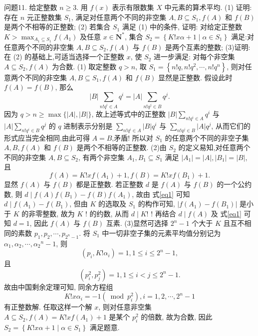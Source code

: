 问题11. 给定整数 $n \geqslant 3$. 用 $f(x)$ 表示有限数集 $X$ 中元素的算术平均.
(1) 证明: 存在 $n$ 元正整数集 $S_1$, 满足对任意两个不同的非空集 $A, B \subseteq S_1, f(A)$ 和 $f(B)$ 是两个不相等的正整数;
(2) 若集合 $S_1$ 满足 (1) 中的条件, 证明: 对给定正整数 $K>\max _{A_1 \subseteq S_1} f\left(A_1\right)$ 及任意 $x \in \mathbf{N}^*$, 集合 $S_2=\left\{K ! x \alpha+1 \mid \alpha \in S_1\right\}$ 满足:对任意两个不同的非空集 $A, B \subseteq S_2, f(A)$ 与 $f(B)$ 是两个互素的整数;
(3)证明: 在 (2) 的基础上,可适当选择一个正整数 $x$, 使 $S_2$ 进一步满足: 对每个非空集 $A \subseteq S_2, f(A)$ 为合数.
(1) 取定整数 $q>n$, 取 $S_1=\left\{n ! q, n ! q^2, \cdots, n ! q^n\right\}$, 则对任意两个不同的非空集 $A, B \subseteq S_1, f(A)$ 和 $f(B)$ 显然是正整数.
假设此时 $f(A)= f(B)$, 那么
$$
|B| \sum_{n ! q^i \in A} q^i=|A| \sum_{n ! q^j \in B} q^j .
$$
因为 $q>n \geqslant \max \{|A|,|B|\}$, 故上述等式中的正整数 $|B| \sum_{n ! q^i \in A} q^i$ 与 $|A| \sum_{n ! q^i \in B} q^j$ 的 $q$ 进制表示分别是 $\sum_{n ! q^i \in A}|B| q^i$ 与 $\sum_{n ! q^j \in B}|A| q^j$, 从而它们的形式应当完全相同,由此可得 $A=B$,矛盾!
所以对 $S_1$ 的任意两个不同的非空子集 $A, B, f(A)$ 和 $f(B)$ 是两个不相等的正整数.
(2)由 $S_2$ 的定义易知,对任意两个不同的非空集 $A, B \subseteq S_2$, 有两个非空集 $A_1, B_1 \subseteq S_1$ 满足 $\left|A_1\right|=|A|,\left|B_1\right|=|B|$, 且
$$
f(A)=K ! x f\left(A_1\right)+1, f(B)=K ! x f\left(B_1\right)+1 . \label{eq1}
$$
显然 $f(A)$ 与 $f(B)$ 都是正整数.
若正整数 $d$ 是 $f(A)$ 与 $f(B)$ 的一个公约数, 则 $d \mid f(A) f\left(B_1\right)- f(B) f\left(A_1\right)$, 故由 式\ref{eq1} 可知 $d \mid f\left(A_1\right)-f\left(B_1\right)$, 但由 $K$ 的选取及 $S_1$ 的构作可知, $\left|f\left(A_1\right)-f\left(B_1\right)\right|$ 是小于 $K$ 的非零整数, 故为 $K$ ! 的约数, 从而 $d \mid K !$ ! 再结合 $d \mid f(A)$ 及 式\ref{eq1} 可知 $d=1$, 因此 $f(A)$ 与 $f(B)$ 互素.
(3)显然可选择 $2^n-1$ 个大于 $K$ 且互不相同的素数 $p_1, p_2, \cdots, p_{2^n-1}$. 将 $S_1$ 中一切非空子集的元素平均值分别记为 $\alpha_1, \alpha_2, \cdots, \alpha_2{ }^n-1$, 则
$$
\left(p_i, K ! \alpha_i\right)=1,1 \leqslant i \leqslant 2^n-1,
$$
且
$$
\left(p_i^2, p_j^2\right)=1,1 \leqslant i<j \leqslant 2^n-1 .
$$
故由中国剩余定理可知, 同余方程组
$$
K ! x \alpha_i=-1\left(\bmod p_i^2\right), i=1,2, \cdots, 2^n-1
$$
有正整数解.
任取这样一个解 $x$, 则对任意非空集 $A \subseteq S_2, f(A)=K ! x f\left(A_1\right)+1$ 是某个 $p_i^2$ 的倍数, 故为合数, 因此 $S_2=\left\{K ! x \alpha+1 \mid \alpha \in S_1\right\}$ 满足题意.


